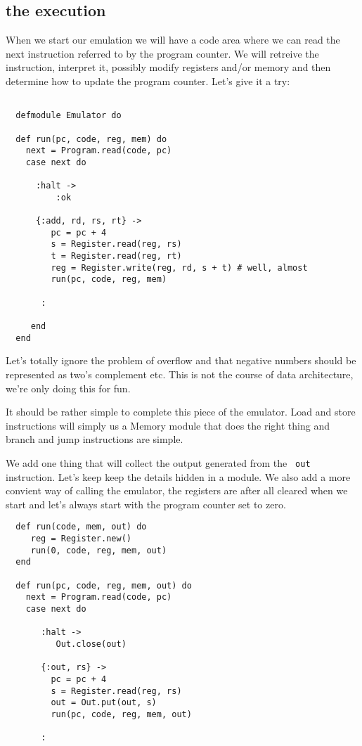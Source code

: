 \documentclass[a4paper,11pt]{article}
\begin{document}
\subsection{the execution}

When we start our emulation we will have a code area where we can read
the next instruction referred to by the program counter. We will
retreive the instruction, interpret it, possibly modify registers
and/or memory and then determine how to update the program
counter. Let's give it a try:

\begin{verbatim}

  defmodule Emulator do
  
  def run(pc, code, reg, mem) do
    next = Program.read(code, pc)
    case next do

      :halt ->  
          :ok

      {:add, rd, rs, rt} ->
         pc = pc + 4
         s = Register.read(reg, rs)
         t = Register.read(reg, rt)
         reg = Register.write(reg, rd, s + t) # well, almost
         run(pc, code, reg, mem)
      
       :

     end
  end
\end{verbatim}
   
Let's totally ignore the problem of overflow and that negative numbers
should be represented as two's complement etc. This is not the course
of data architecture, we're only doing this for fun.

It should be rather simple to complete this piece of the
emulator. Load and store instructions will simply us a Memory module
that does the right thing and branch and jump instructions are simple.


We add one thing that will collect the output generated from the {\tt
  out} instruction. Let's keep keep the details hidden in a module. We
also add a more convient way of calling the emulator, the registers
are after all cleared when we start and let's always start with the
program counter set to zero.


\begin{verbatim}
  def run(code, mem, out) do
     reg = Register.new() 
     run(0, code, reg, mem, out)
  end

  def run(pc, code, reg, mem, out) do
    next = Program.read(code, pc)
    case next do
 
       :halt ->
          Out.close(out)
    
       {:out, rs} ->
         pc = pc + 4
         s = Register.read(reg, rs)
         out = Out.put(out, s)
         run(pc, code, reg, mem, out)

       :
 \end{verbatim}
\end{document}
